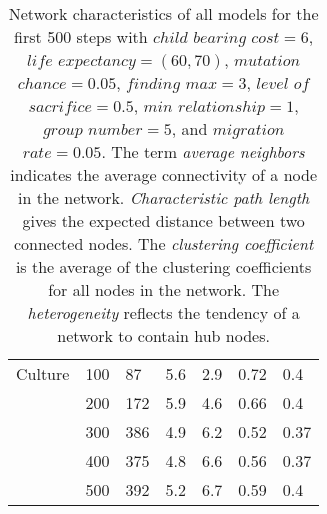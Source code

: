 \begin{table}[]
\begin{tabular}{@{}lllllll@{}}
Culture        & 100  & 87    & 5.6                       & 2.9                       & 0.72                      & 0.4           \\
& 200  & 172   & 5.9                       & 4.6                       & 0.66                      & 0.4           \\
& 300  & 386   & 4.9                       & 6.2                       & 0.52                      & 0.37          \\
& 400  & 375   & 4.8                       & 6.6                       & 0.56                      & 0.37          \\
& 500  & 392   & 5.2                       & 6.7                       & 0.59                      & 0.4           \\ \bottomrule
    \end{tabular}
\caption[Network characteristics of all models]{Network characteristics of all models for the first 500 steps with $child$ $bearing$ $cost = 6$, $life$ $expectancy = (60,70)$, $mutation$ $chance = 0.05$, $finding$ $max = 3$, $level$ $of$ $sacrifice = 0.5$, $min$ $relationship = 1$, $group$ $number = 5$, and $migration$ $rate = 0.05$. The term \textit{average neighbors} indicates the average connectivity of a node in the network. \textit{Characteristic path length} gives the expected distance between two connected nodes. The \textit{clustering coefficient} is the average of the clustering coefficients for all nodes in the network. The \textit{heterogeneity} reflects the tendency of a network to contain hub nodes. \cite{NetworkAnalyzer.18.05.2018}}
\label{tab:network-analysis}
\end{table}